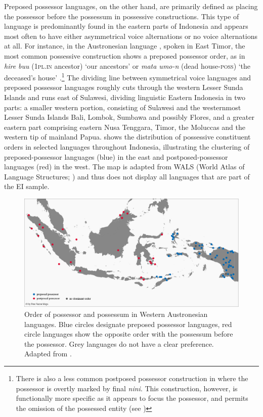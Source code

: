 Preposed possessor languages, on the other hand, are primarily defined as placing the possessor before the possessum in possessive constructions. This type of language is predominantly found in the eastern parts of Indonesia and appears most often to have either asymmetrical voice alternations or no voice alternations at all. For instance, in the Austronesian language , spoken in East Timor, the most common possessive construction shows a preposed possessor order, as in \textit{hire buu} (1\textsc{pl}.\textsc{in} ancestor) `our ancestors' or \textit{mata umo-n} (dead house-\textsc{poss}) `the deceased's house' \citep[31]{bowden2006} .\footnote{There is also a less common postposed possessor construction in  where the possessor is overtly marked by final \textit{nini}. This construction, however, is functionally more specific as it appears to focus the possessor, and permits the omission of the possessed entity (see \citealt[32]{bowden2006})} The dividing line between symmetrical voice languages and preposed possessor languages roughly cuts through the western Lesser Sunda Islands and runs east of Sulawesi, dividing linguistic Eastern Indonesia in two parts: a smaller western portion, consisting of Sulawesi and the westernmost Lesser Sunda Islands Bali, Lombok, Sumbawa and possibly Flores, and a greater eastern part comprising eastern Nusa Tenggara, Timor, the Moluccas and the western tip of mainland Papua.  shows the distribution of possessive constituent orders in selected languages throughout Indonesia, illustrating the clustering of preposed-possessor languages (blue) in the east and postposed-possessor languages (red) in the west. The map is adapted from WALS (World Atlas of Language Structures; \citealt{wals-86}) and thus does not display all languages that are part of the EI sample.

\begin{figure}
\includegraphics[width=\columnwidth]{figures/Preposed_possessor.eps}
\caption[Order of possessor and possessum in Western Austronesian languages]{Order of possessor and possessum in Western Austronesian languages. Blue circles designate preposed possessor languages, red circle languages show the opposite order with the possessum before the possessor. Grey languages do not have a clear preference. Adapted from \citet{wals-86}.}\label{figure:preposed}
\end{figure}

